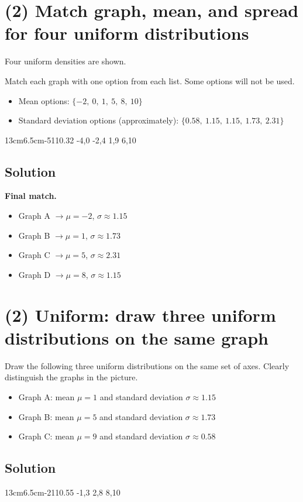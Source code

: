 \section{(2) Match graph, mean, and spread for four uniform distributions}
Four uniform densities are shown.

Match each graph with one option from each list. Some options will not be used.
\begin{itemize}
\item Mean options: $\{-2,\ 0,\ 1,\ 5,\ 8,\ 10\}$
\item Standard deviation options (approximately): $\{0.58,\ 1.15,\ 1.15,\ 1.73,\ 2.31\}$
\end{itemize}
\UniformFourGraph
{13cm}{6.5cm}{-5}{11}{0.32}
{-4,0}
{-2,4}
{1,9}
{6,10}

\subsection*{Solution}
\textbf{Final match.}
\begin{itemize}
\item Graph A $\to \mu=-2$, $\sigma\approx1.15$
\item Graph B $\to \mu=1$, $\sigma\approx1.73$
\item Graph C $\to \mu=5$, $\sigma\approx2.31$
\item Graph D $\to \mu=8$, $\sigma\approx1.15$
\end{itemize}

\section{(2) Uniform: draw three uniform distributions on the same graph}
Draw the following three uniform distributions on the same set of axes. Clearly distinguish the graphs in the picture.
\begin{itemize}
\item Graph A: mean $\mu=1$ and standard deviation $\sigma\approx1.15$
\item Graph B: mean $\mu=5$ and standard deviation $\sigma\approx1.73$
\item Graph C: mean $\mu=9$ and standard deviation $\sigma\approx0.58$
\end{itemize}
\subsection*{Solution}
\UniformThreeGraph
{13cm}{6.5cm}{-2}{11}{0.55}
{-1,3}
{2,8}
{8,10}

